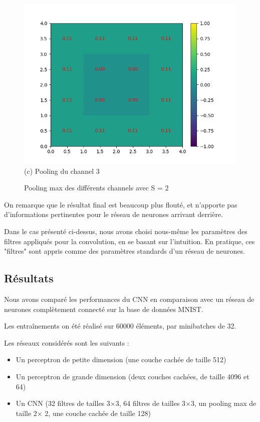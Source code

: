 \begin{figure}[h]
        \includegraphics[width=\textwidth]{img/cnn_exemple/square/stride_3_max.png}
        \center 
        (c) Pooling du channel 3
    \endminipage
    \caption{Pooling max des différents channels avec S = 2} 
\end{figure}



On remarque que le résultat final est beaucoup plus flouté, et n'apporte pas d'informations pertinentes pour le réseau de 
neurones arrivant derrière.


Dans le cas présenté ci-dessus, nous avons choisi nous-même les paramètres des filtres appliqués pour la convolution,
en se basant sur l'intuition.
En pratique, ces "filtres" sont appris comme des paramètres standards d'un réseau de neurones.

\newpage

\subsection{Résultats}

Nous avons comparé les performances du CNN en comparaison avec un réseau de neurones complètement connecté sur la base de 
données MNIST.

Les entraînements on été réalisé sur 60000 éléments, par minibatches de 32.

Les réseaux considérés sont les suivants : 
\begin{itemize}
    \item Un perceptron de petite dimension (une couche cachée de taille 512)
    \item Un perceptron de grande dimension (deux couches cachées, de taille 4096 et 64)
    \item Un CNN (32 filtres de tailles 3$\times$3, 64 filtres de tailles 3$\times$3, un pooling max de taille 2$\times$ 2, une couche cachée de taille 128)
\end{itemize}

